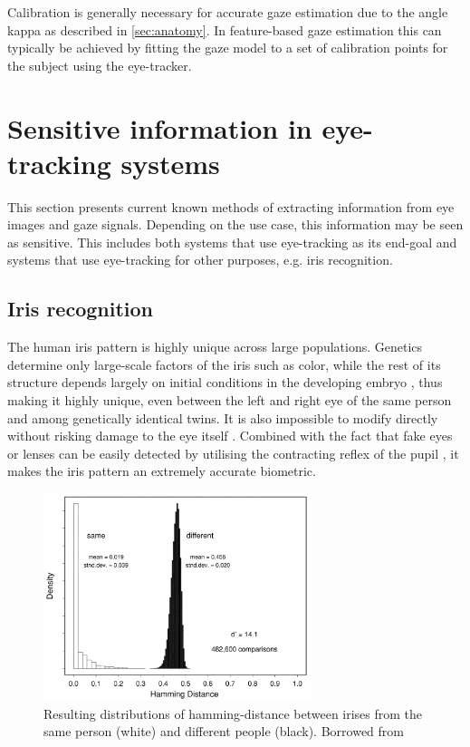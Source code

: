 Calibration is generally necessary for accurate gaze estimation due to the angle kappa as described in \cref{sec:anatomy}. In feature-based gaze estimation this can typically be achieved by fitting the gaze model to a set of calibration points for the subject using the eye-tracker.

\section{Sensitive information in eye-tracking systems}
This section presents current known methods of extracting information from eye images and gaze signals. Depending on the use case, this information may be seen as sensitive. This includes both systems that use eye-tracking as its end-goal and systems that use eye-tracking for other purposes, e.g. iris recognition.


\subsection{Iris recognition}
The human iris pattern is highly unique across large populations. Genetics determine only large-scale factors of the iris such as color, while the rest of its structure depends largely on initial conditions in the developing embryo \parencite{KRONFELD19621}, thus making it highly unique, even between the left and right eye of the same person and among genetically identical twins. It is also impossible to modify directly without risking damage to the eye itself \parencite{DAUGMAN_IRIS_ORIG}. Combined with the fact that fake eyes or lenses can be easily detected by utilising the contracting reflex of the pupil \parencite{DAUGMAN_IRIS_ORIG}, it makes the iris pattern an extremely accurate biometric. 

\begin{figure}
	\centering
	\includegraphics[width=0.7\textwidth]{figures/hamming-dist}
	\caption{Resulting distributions of hamming-distance between irises from the same person (white) and different people (black). Borrowed from \cite{DAUGMAN_IRIS_SIMPLE}}\label{fig:hamming-dist}
\end{figure}

